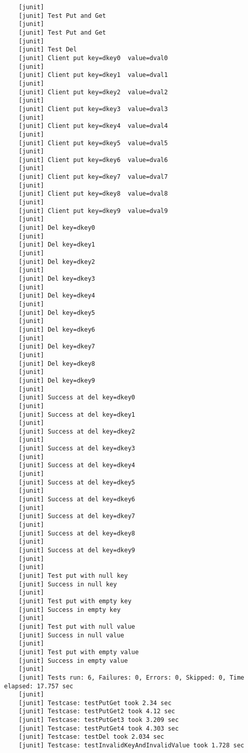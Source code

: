 \documentclass{article}
\begin{document}
\begin{lstlisting}
    [junit] 
    [junit] Test Put and Get
    [junit] 
    [junit] Test Put and Get
    [junit] 
    [junit] Test Del
    [junit] Client put key=dkey0  value=dval0
    [junit] 
    [junit] Client put key=dkey1  value=dval1
    [junit] 
    [junit] Client put key=dkey2  value=dval2
    [junit] 
    [junit] Client put key=dkey3  value=dval3
    [junit] 
    [junit] Client put key=dkey4  value=dval4
    [junit] 
    [junit] Client put key=dkey5  value=dval5
    [junit] 
    [junit] Client put key=dkey6  value=dval6
    [junit] 
    [junit] Client put key=dkey7  value=dval7
    [junit] 
    [junit] Client put key=dkey8  value=dval8
    [junit] 
    [junit] Client put key=dkey9  value=dval9
    [junit] 
    [junit] Del key=dkey0
    [junit] 
    [junit] Del key=dkey1
    [junit] 
    [junit] Del key=dkey2
    [junit] 
    [junit] Del key=dkey3
    [junit] 
    [junit] Del key=dkey4
    [junit] 
    [junit] Del key=dkey5
    [junit] 
    [junit] Del key=dkey6
    [junit] 
    [junit] Del key=dkey7
    [junit] 
    [junit] Del key=dkey8
    [junit] 
    [junit] Del key=dkey9
    [junit] 
    [junit] Success at del key=dkey0
    [junit] 
    [junit] Success at del key=dkey1
    [junit] 
    [junit] Success at del key=dkey2
    [junit] 
    [junit] Success at del key=dkey3
    [junit] 
    [junit] Success at del key=dkey4
    [junit] 
    [junit] Success at del key=dkey5
    [junit] 
    [junit] Success at del key=dkey6
    [junit] 
    [junit] Success at del key=dkey7
    [junit] 
    [junit] Success at del key=dkey8
    [junit] 
    [junit] Success at del key=dkey9
    [junit] 
    [junit] 
    [junit] Test put with null key
    [junit] Success in null key
    [junit] 
    [junit] Test put with empty key
    [junit] Success in empty key
    [junit] 
    [junit] Test put with null value
    [junit] Success in null value
    [junit] 
    [junit] Test put with empty value
    [junit] Success in empty value
    [junit] 
    [junit] Tests run: 6, Failures: 0, Errors: 0, Skipped: 0, Time elapsed: 17.757 sec
    [junit] 
    [junit] Testcase: testPutGet took 2.34 sec
    [junit] Testcase: testPutGet2 took 4.12 sec
    [junit] Testcase: testPutGet3 took 3.209 sec
    [junit] Testcase: testPutGet4 took 4.303 sec
    [junit] Testcase: testDel took 2.034 sec
    [junit] Testcase: testInvalidKeyAndInvalidValue took 1.728 sec
\end{lstlisting}
\end{document}
